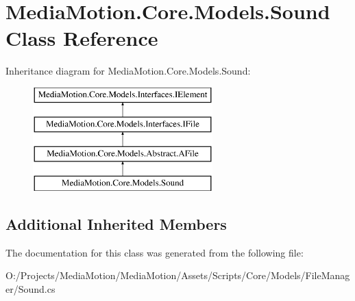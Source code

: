 \hypertarget{class_media_motion_1_1_core_1_1_models_1_1_sound}{\section{Media\+Motion.\+Core.\+Models.\+Sound Class Reference}
\label{class_media_motion_1_1_core_1_1_models_1_1_sound}
}
Inheritance diagram for Media\+Motion.\+Core.\+Models.\+Sound\+:\begin{figure}[H]
\begin{center}
\leavevmode
\includegraphics[height=4.000000cm]{class_media_motion_1_1_core_1_1_models_1_1_sound}
\end{center}
\end{figure}
\subsection*{Additional Inherited Members}


The documentation for this class was generated from the following file\+:\begin{DoxyCompactItemize}
\item 
O\+:/\+Projects/\+Media\+Motion/\+Media\+Motion/\+Assets/\+Scripts/\+Core/\+Models/\+File\+Manager/Sound.\+cs\end{DoxyCompactItemize}
